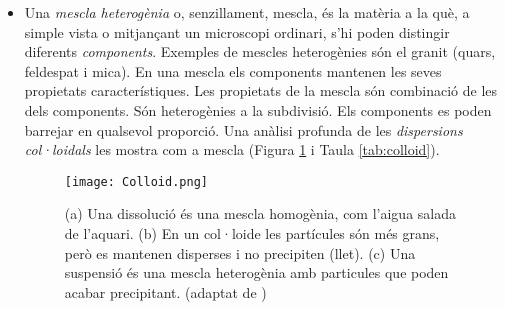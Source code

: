 \begin{itemize}
\item Una \emph{mescla heterogènia} o, senzillament, mescla, és la matèria a la què, a simple vista o mitjançant un microscopi ordinari, s'hi poden distingir diferents \emph{components}. Exemples de mescles heterogènies són el granit (quars, feldespat i mica). En una mescla els components mantenen les seves propietats característiques. Les propietats de la mescla són combinació de les dels components. Són heterogènies a la subdivisió. Els components es poden barrejar en qualsevol proporció. Una anàlisi profunda de les \emph{dispersions col·loidals} les mostra com a mescla (Figura \ref{fig:Colloid} i Taula \ref{tab:colloid}). 
\begin{figure}[h]
\centering
\texttt{[image: Colloid.png]}
\caption[Dissolucions, suspensions i col·loides]{(a) Una dissolució és una mescla homogènia, com l'aigua salada de l'aquari. (b) En un col·loide les partícules són més grans, però es mantenen disperses i no precipiten (llet). (c) Una suspensió és una mescla heterogènia amb particules que poden acabar precipitant. (adaptat de \citep{fernandez-nieves_fluids_2016})}
\label{fig:Colloid}
\end{figure}


\end{itemize}
